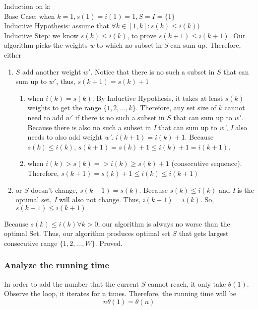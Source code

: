\documentclass{article}
\begin{document}
            Induction on k:\\
            Base Case: when $k = 1, s(1)=i(1)=1, S=I=\{1\}$\\
            Inductive Hypothesis: assume that $\forall k\in [1,k]: s(k)\leq i(k))$\\
            Inductive Step: we know $s(k)\leq i(k)$, to prove $s(k+1)\leq i(k+1)$. Our algorithm picks the weights \textit{w} to which no subset in \textit{S} can sum up. Therefore, either \begin{enumerate}
                \item $S$ add another weight $w'$. Notice that there is no such a subset in $S$ that can sum up to $w'$, thus, $s(k+1) = s(k) + 1$
                \begin{enumerate}
                    \item when $i(k) = s(k)$. By Inductive Hypothesis, it takes at least $s(k)$ weights to get the range $\{1,2,...,k\}$. Therefore, any set size of $k$ cannot need to add $w'$ if there is no such a subset in $S$ that can sum up to $w'$.
                    Because there is also no such a subset in \textit{I} that can sum up to \textit{w'}, \textit{I} also needs to also add weight \textit{w'}. $i(k+1) = i(k)+1$. Because $s(k)\leq i(k)$, $s(k+1)=s(k)+1\leq i(k)+1=i(k+1)$.
                    
                    \item when $i(k) > s(k) => i(k) \geq s(k) + 1$ (consecutive sequence). Therefore, $s(k+1)=s(k)+1\leq i(k)\leq i(k+1)$
                    
                \end{enumerate}
                \item or $S$ doesn't change, $s(k+1) = s(k)$. Because $s(k)\leq i(k)$ and \textit{I} is the optimal set, \textit{I} will also not change. Thus, $i(k+1)=i(k)$. So, $s(k+1)\leq i(k+1)$
            \end{enumerate}

            Because $s(k)\leq i(k) \forall k>0$, our algorithm is always no worse than the optimal Set. Thus, our algorithm produces optimal set $S$ that gets largest consecutive range $\{1,2,...,W\}$. Proved.

        \subsubsection{Analyze the running time}
            In order to add the number that the current $S$ cannot reach, it only take $\theta(1)$. Observe the loop, it iterates for n times. Therefore, the running time will be
            \[n\theta(1)=\theta(n)\]
            
\end{document}
